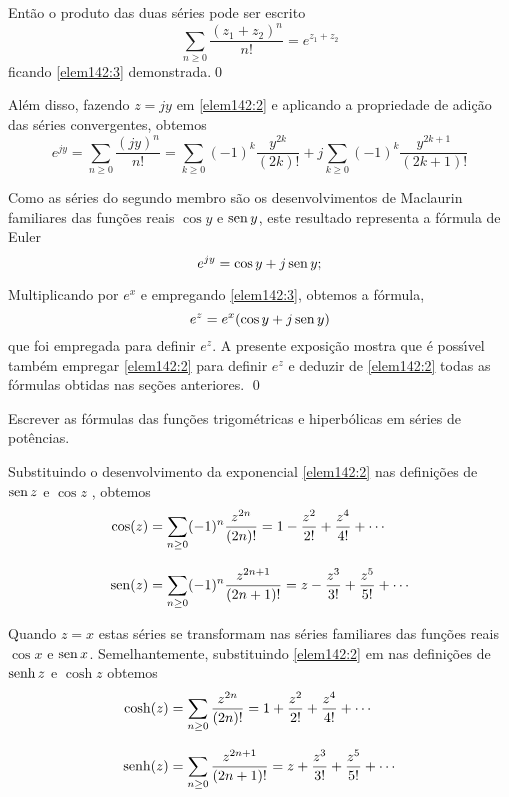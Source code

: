 Ent\~{a}o o produto das duas s\'{e}ries pode ser escrito
\begin{equation*}
\sum_{n\geq 0}\frac{(z_1+z_2)^n}{n!}=e^{z_1+z_2}
\end{equation*}
ficando \eqref{elem142:3} demonstrada.\qed

Al\'{e}m disso, fazendo $z =jy$ em \eqref{elem142:2} e aplicando a
propriedade de adi\c{c}\~{a}o das s\'{e}ries convergentes, obtemos
\begin{equation*}
e^{jy}=\sum_{n\geq 0}\frac{(jy)^n}{n!}=\sum_{k\geq 0}(-1)^k
\frac{y^{2k}}{(2k)!}+j\sum_{k\geq 0}(-1)^k
\frac{y^{2k+1}}{(2k+1)!}
\end{equation*}

Como as s\'{e}ries do segundo membro s\~{a}o os desenvolvimentos de
Maclaurin familiares das fun\c{c}\~{o}es reais $\cos y$ e $\operatorname{sen} y$, este
resultado representa a f\'{o}rmula de Euler
\begin{equation}\label{elem142:4}
e^{jy} = \cos y + j \operatorname{sen} y;
\end{equation}

Multiplicando por $e^x$ e empregando \eqref{elem142:3}, obtemos a
f\'{o}rmula,
\begin{equation*}
e^z=e^x(\cos y +j\operatorname{sen} y)
\end{equation*}
que foi empregada para definir $e^z$. A presente exposi\c{c}\~{a}o mostra
que \'{e} poss\'{\i}vel tamb\'{e}m empregar \eqref{elem142:2} para definir
$e^z$ e deduzir de \eqref{elem142:2} todas as f\'{o}rmulas obtidas nas
se\c{c}\~{o}es anteriores. \qed

\begin{exer}
Escrever as f\'{o}rmulas das fun\c{c}\~{o}es trigom\'{e}tricas e hiperb\'{o}licas em
s\'{e}ries de pot\^{e}ncias.
\end{exer}

\solo  Substituindo o desenvolvimento da exponencial \eqref{elem142:2} nas defini\c{c}\~{o}es de $\operatorname{sen}
z$ e $\cos z$ , obtemos
\begin{align}\label{elem142:5}
  \cos(z) & = \sum_{n\geq 0}(-1)^n\frac{z^{2n}}{(2n)!}=1-\frac{z^2}{2!}+\frac{z^4}{4!}+\cdots\\[2ex]
  \operatorname{sen}(z) &= \sum_{n\geq 0}(-1)^n\frac{z^{2n+1}}{(2n+1)!}=z-\frac{z^3}{3!}+\frac{z^5}{5!}+\cdots
\end{align}

Quando $z = x$ estas s\'{e}ries se transformam nas s\'{e}ries familiares
das fun\c{c}\~{o}es reais $\cos x$ e $\operatorname{sen} x$. Semelhantemente,
substituindo \eqref{elem142:2} em nas defini\c{c}\~{o}es de $\operatorname{senh} z$ e
$\cosh z$ obtemos
\begin{align}\label{elem142:6}
  \cosh(z) &=\sum_{n\geq 0}\frac{z^{2n}}{(2n)!}=1+\frac{z^2}{2!}+\frac{z^4}{4!}+\cdots \\[2ex]
  \operatorname{senh}(z) &=\sum_{n\geq
  0}\frac{z^{2n+1}}{(2n+1)!}=z+\frac{z^3}{3!}+\frac{z^5}{5!}+\cdots
\end{align}

